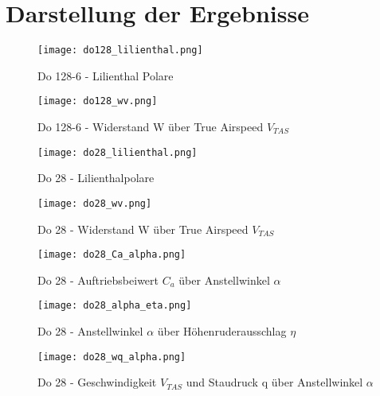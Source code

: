 \chapter{Darstellung der Ergebnisse}
\label{chapter:darstellung}
\vspace{2cm}
\begin{figure}[h]
	\begin{center}
		\texttt{[image: do128\_lilienthal.png]} 
		\caption{Do 128-6 - Lilienthal Polare}
	\end{center}
\end{figure}
\begin{figure}[h]
	\begin{center}
		\texttt{[image: do128\_wv.png]} 
		\caption{Do 128-6 - Widerstand W über True Airspeed $V_{TAS}$}
	\end{center}
\end{figure}
\vspace{-10mm}
\begin{figure}[h]
	\begin{center}
		\texttt{[image: do28\_lilienthal.png]} 
		\caption{Do 28 - Lilienthalpolare}
	\end{center}
\end{figure}
\begin{figure}[h]
\begin{center}
	\texttt{[image: do28\_wv.png]} 
	\caption{Do 28 - Widerstand W über True Airspeed $V_{TAS}$}
\end{center}
\end{figure}
\begin{figure}[h]
\begin{center}
	\texttt{[image: do28\_Ca\_alpha.png]} 
	\caption{Do 28 - Auftriebsbeiwert $C_a$ über Anstellwinkel $\alpha$}
\end{center}
\end{figure}
\begin{figure}[h]
\begin{center}
	\texttt{[image: do28\_alpha\_eta.png]} 
	\caption{Do 28 - Anstellwinkel $\alpha$ über Höhenruderausschlag $\eta$}
\end{center}
\end{figure}
\begin{figure}[h]
\begin{center}
	\texttt{[image: do28\_wq\_alpha.png]} 
	\caption{Do 28 - Geschwindigkeit $V_{TAS}$ und Staudruck q über Anstellwinkel $\alpha$}
\end{center}
\end{figure}
\newpage